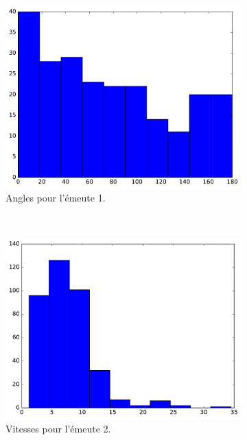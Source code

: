 \begin{appendices}
\begin{figure}[htbp]
\begin{subfigure}[t]{\subImgWclicks}
			\centering
			\includegraphics[width=\textwidth]{figures/ch3/riot_angle}
			\caption{Angles pour l'émeute 1.}
			\label{fig:riot_angle}
		\end{subfigure}
		~
		\begin{subfigure}[t]{\subImgWclicks}
			\centering
			\includegraphics[width=\textwidth]{figures/ch3/riot2a_filteredSpeed}
			\caption{Vitesses pour l'émeute 2.}
			\label{fig:riot2a_filteredSpeed}
		\end{subfigure}
		~
		\begin{subfigure}[t]{\subImgWclicks}
			\centering

\end{subfigure}
\end{figure}
\end{appendices}
